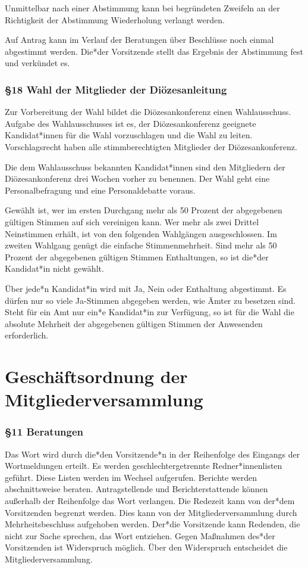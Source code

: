 \documentclass[12pt]{report}
\begin{document}
\begin{flushleft}
Unmittelbar nach einer Abstimmung kann bei begründeten Zweifeln an der Richtigkeit der Abstimmung 
Wiederholung verlangt werden.

Auf Antrag kann im Verlauf der Beratungen über Beschlüsse noch einmal abgestimmt werden.
{\color{red}Die*der} Vorsitzende stellt das Ergebnis der Abstimmung fest und verkündet es.

\subsection*{§18 Wahl der Mitglieder der Diözesanleitung}
Zur Vorbereitung der Wahl bildet die Diözesankonferenz einen Wahlausschuss. Aufgabe des Wahlausschusses
ist es, der Diözesankonferenz geeignete {\color{red}Kandidat*innen} für die Wahl vorzuschlagen und die Wahl zu leiten.
Vorschlagsrecht haben alle stimmberechtigten Mitglieder der Diözesankonferenz.

Die dem Wahlausschuss bekannten {\color{red}Kandidat*innen} sind den Mitgliedern der Diözesankonferenz drei Wochen
vorher zu benennen. Der Wahl geht eine Personalbefragung und eine Personaldebatte voraus.

Gewählt ist, wer im ersten Durchgang mehr als 50 Prozent der abgegebenen gültigen Stimmen auf sich 
vereinigen kann. Wer mehr als zwei Drittel Neinstimmen erhält, ist von den folgenden Wahlgängen ausgeschlossen. 
Im zweiten Wahlgang genügt die einfache Stimmenmehrheit. Sind mehr als 50 Prozent der abgegebenen
gültigen Stimmen Enthaltungen, so ist {\color{red}die*der Kandidat*in} nicht gewählt.

Über {\color{red}jede*n Kandidat*in} wird mit Ja, Nein oder Enthaltung abgestimmt. Es dürfen nur so viele Ja-Stimmen
abgegeben werden, wie Ämter zu besetzen sind. Steht für ein Amt nur {\color{red}ein*e Kandidat*in} zur Verfügung, so ist für
die Wahl die absolute Mehrheit der abgegebenen gültigen Stimmen der Anwesenden erforderlich.

\chapter*{Geschäftsordnung der Mitgliederversammlung}

\subsection*{§11 Beratungen}
Das Wort wird durch die*den Vorsitzende*n in der Reihenfolge des Eingangs der Wortmeldungen erteilt.
{\color{red} Es werden geschlechtergetrennte Redner*innenlisten geführt. Diese Listen werden im Wechsel aufgerufen.} Berichte werden
abschnittsweise beraten. Antragstellende und Berichterstattende können außerhalb der Reihenfolge das
Wort verlangen. Die Redezeit kann von der*dem Vorsitzenden begrenzt werden. Dies kann von der 
Mitgliederversammlung durch Mehrheitsbeschluss aufgehoben werden. Der*die Vorsitzende kann Redenden, die
nicht zur Sache sprechen, das Wort entziehen. Gegen Maßnahmen des*der Vorsitzenden ist Widerspruch
möglich. Über den Widerspruch entscheidet die Mitgliederversammlung.

\end{flushleft}
\end{document}
